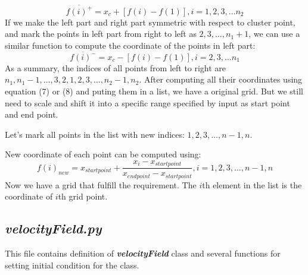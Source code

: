 \documentclass[11pt]{article}
\begin{document}
	    \begin{equation}
		\overline{f(i)^+}=x_c+[f(i)-f(1)], i=1,2,3,\dots n_2
	    \end{equation}
	    If we make the left part and right part symmetric with respect to cluster point, and mark the points in left part from right to left as $2,3,\dots,n_1+1$, we can use a similar function to compute the coordinate of the points in left part:
	    \begin{equation}
		\overline{f(i)^-}=x_c-[f(i)-f(1)], i=2,3,\dots n_1
	    \end{equation}
	    As a summary, the indices of all points from left to right are $n_1,n_1-1,\dots,3,2,1,2,3,\dots,n_2-1,n_2$. After computing all their coordinates using equation (7) or (8) and puting them in a list, we have a original grid. But we still need to scale and shift it into a specific range specified by input as start point and end point.\par
	    Let's mark all points in the list with new indices: $1,2,3,\dots,n-1,n$.\par
	    New coordinate of each point can be computed using:
	    \begin{equation}
		f(i)_{new}=x_{startpoint}+\frac{x_i-x_{startpoint}}{x_{endpoint}-x_{startpoint}},i=1,2,3,\dots,n-1,n
	    \end{equation}
	    Now we have a grid that fulfill the requirement. The $i$th element in the list is the coordinate of $i$th grid point.

    \subsection{\textbf{\textit{velocityField.py}}}
    This file contains definition of \textbf{\textit{velocityField}} class and several functions for setting initial condition for the class.
\end{document}
